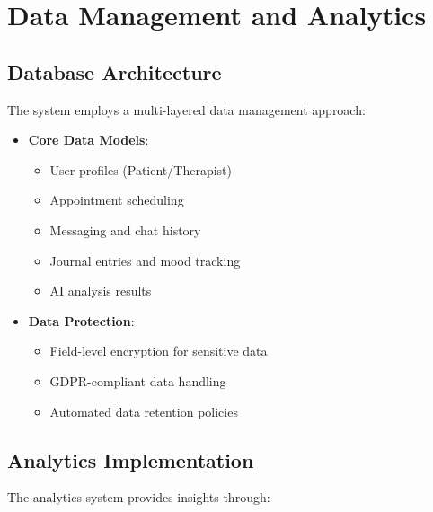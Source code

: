 \section{Data Management and Analytics}

\subsection{Database Architecture}
The system employs a multi-layered data management approach:

\begin{itemize}
  \item \textbf{Core Data Models}:
    \begin{itemize}
      \item User profiles (Patient/Therapist)
      \item Appointment scheduling
      \item Messaging and chat history
      \item Journal entries and mood tracking
      \item AI analysis results
    \end{itemize}
    
  \item \textbf{Data Protection}:
    \begin{itemize}
      \item Field-level encryption for sensitive data
      \item GDPR-compliant data handling
      \item Automated data retention policies
    \end{itemize}
\end{itemize}

\subsection{Analytics Implementation}
The analytics system provides insights through:

